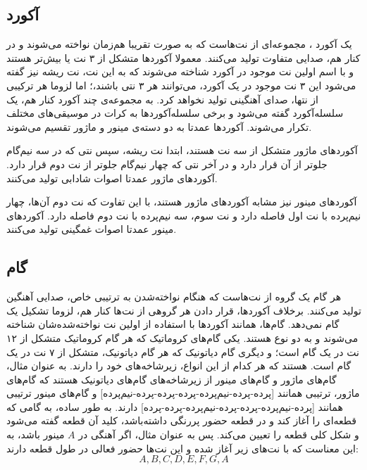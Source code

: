 \subsection{
آکورد
}

یک آکورد
، مجموعه‌ای از نت‌هاست که به صورت تقریبا هم‌زمان نواخته می‌شوند و در کنار هم، صدایی متفاوت تولید می‌کنند.
معمولا آکوردها متشکل از ۳ نت یا بیش‌تر هستند و با اسم اولین نت موجود در آکورد شناخته می‌شوند که به این نت، نت ریشه
نیز گفته می‌شود این ۳ نت موجود در یک آکورد، می‌توانند هر ۳ نتی باشند،؛ اما لزوما هر ترکیبی از نتها، صدای آهنگینی تولید نخواهد کرد.
به مجموعه‌ی چند آکورد کنار هم، یک سلسله‌آکورد
گفته می‌شود و برخی سلسله‌آکوردها به کرات در موسیقی‌های مختلف تکرار می‌شوند.
آکوردها عمدتا به دو دسته‌ی مینور
و ماژور
تقسیم می‌شوند.

آکوردهای ماژور متشکل از سه نت هستند، ابتدا نت ریشه، سپس نتی که در سه نیم‌گام جلوتر از آن قرار دارد و در آخر نتی که چهار نیم‌گام جلوتر از نت دوم قرار دارد. آکوردهای ماژور عمدتا اصوات شادابی تولید می‌کنند.

آکوردهای مینور نیز مشابه آکوردهای ماژور هستند، با این تفاوت که نت دوم آن‌ها، چهار نیم‌پرده با نت اول فاصله دارد و نت سوم، سه نیم‌پرده با نت دوم فاصله دارد.
آکوردهای مینور عمدتا اصوات غمگینی تولید می‌کنند.

\subsection{
گام
}
هر گام
یک گروه از نت‌هاست که هنگام نواخته‌شدن به ترتیبی خاص، صدایی آهنگین تولید می‌کنند. برخلاف آکوردها، قرار دادن هر گروهی از نت‌ها کنار هم، لزوما تشکیل یک گام نمی‌دهد.
گام‌ها، همانند آکوردها با استفاده از اولین نت نواخته‌شده‌شان شناخته می‌شوند و به دو نوع هستند. یکی
گام‌های کروماتیک
که هر گام کروماتیک متشکل از ۱۲ نت در یک گام است؛
و دیگری گام دیاتونیک
که هر گام دیاتونیک، متشکل از ۷ نت در یک گام است.
هستند که هر کدام از این انواع، زیرشاخه‌های خود را دارند. به عنوان مثال، گام‌های ماژور
و گام‌های مینور
از زیرشاخه‌های گام‌های دیاتونیک هستند که گام‌های ماژور، ترتیبی همانند
[پرده-پرده-نیم‌پرده-پرده-پرده-پرده-نیم‌پرده]
و گام‌های مینور ترتیبی همانند
[پرده-نیم‌پرده-پرده-پرده-نیم‌پرده-پرده-پرده] دارند.
به طور ساده، به گامی که قطعه‌ای را آغاز کند و در قطعه حضور پررنگی داشته‌باشد، کلید
آن قطعه گفته می‌شود و شکل کلی قطعه را تعیین می‌کند.
پس به عنوان مثال، اگر آهنگی در
$A$
مینور باشد، به این معناست که با نت‌های زیر آغاز شده و این نت‌ها حضور فعالی در طول قطعه دارند:
\begin{equation}
    A, B, C, D, E, F, G, A
\end{equation}
